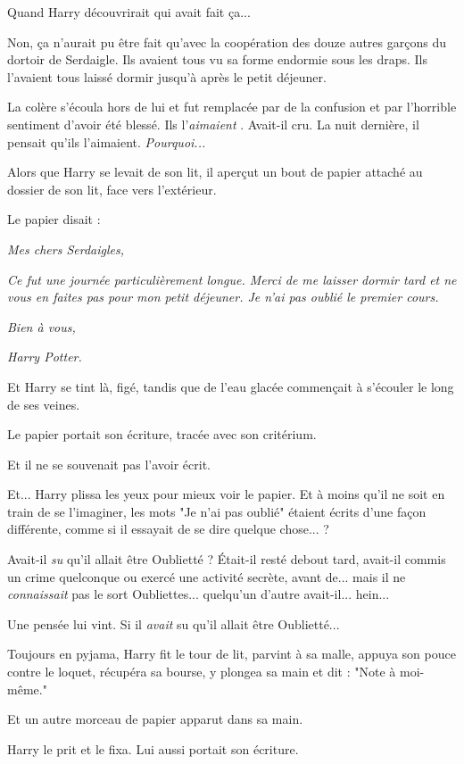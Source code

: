 Quand Harry découvrirait qui avait fait ça...

Non, ça n'aurait pu être fait qu'avec la coopération des douze autres garçons du dortoir de Serdaigle. Ils avaient tous vu sa forme endormie sous les draps. Ils l'avaient tous laissé dormir jusqu'à après le petit déjeuner.

La colère s'écoula hors de lui et fut remplacée par de la confusion et par l'horrible sentiment d'avoir été blessé. Ils l'\emph{aimaient} . Avait-il cru. La nuit dernière, il pensait qu'ils l'aimaient. \emph{Pourquoi...} 

Alors que Harry se levait de son lit, il aperçut un bout de papier attaché au dossier de son lit, face vers l'extérieur.

Le papier disait :

\emph{Mes chers Serdaigles,} 

\emph{Ce fut une journée particulièrement longue. Merci de me laisser dormir tard et ne vous en faites pas pour mon petit déjeuner. Je n'ai pas oublié le premier cours.} 

\emph{Bien à vous,} 

\emph{Harry Potter.} 

Et Harry se tint là, figé, tandis que de l'eau glacée commençait à s'écouler le long de ses veines.

Le papier portait son écriture, tracée avec son critérium.

Et il ne se souvenait pas l'avoir écrit.

Et... Harry plissa les yeux pour mieux voir le papier. Et à moins qu'il ne soit en train de se l'imaginer, les mots "Je n'ai pas oublié" étaient écrits d'une façon différente, comme si il essayait de se dire quelque chose... ?

Avait-il \emph{su}  qu'il allait être Oublietté ? Était-il resté debout tard, avait-il commis un crime quelconque ou exercé une activité secrète, avant de... mais il ne \emph{connaissait}  pas le sort Oubliettes... quelqu'un d'autre avait-il... hein...

Une pensée lui vint. Si il \emph{avait}  su qu'il allait être Oublietté...

Toujours en pyjama, Harry fit le tour de lit, parvint à sa malle, appuya son pouce contre le loquet, récupéra sa bourse, y plongea sa main et dit : "Note à moi-même."

Et un autre morceau de papier apparut dans sa main.

Harry le prit et le fixa. Lui aussi portait son écriture.

